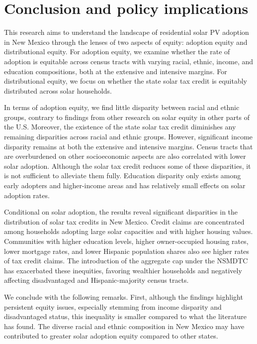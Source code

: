 \documentclass[11pt,twoside,letterpaper]{article}
\begin{document}
\section[Conclusion]{Conclusion and policy implications}

This research aims to understand the landscape of residential solar PV adoption in New Mexico through the lenses of two aspects of equity: adoption equity and distributional equity. For adoption equity, we examine whether the rate of adoption is equitable across census tracts with varying racial, ethnic, income, and education compositions, both at the extensive and intensive margins. For distributional equity, we focus on whether the state solar tax credit is equitably distributed across solar households.

In terms of adoption equity, we find little disparity between racial and ethnic groups, contrary to findings from other research on solar equity in other parts of the U.S. Moreover, the existence of the state solar tax credit diminishes any remaining disparities across racial and ethnic groups. However, significant income disparity remains at both the extensive and intensive margins. Census tracts that are overburdened on other socioeconomic aspects are also correlated with lower solar adoption. Although the solar tax credit reduces some of these disparities, it is not sufficient to alleviate them fully. Education disparity only exists among early adopters and higher-income areas and has relatively small effects on solar adoption rates.

Conditional on solar adoption, the results reveal significant disparities in the distribution of solar tax credits in New Mexico. Credit claims are concentrated among households adopting large solar capacities and with higher housing values. Communities with higher education levels, higher owner-occupied housing rates, lower mortgage rates, and lower Hispanic population shares also see higher rates of tax credit claims. The introduction of the aggregate cap under the NSMDTC has exacerbated these inequities, favoring wealthier households and negatively affecting disadvantaged and Hispanic-majority census tracts.

We conclude with the following remarks. First, although the findings highlight persistent equity issues, especially stemming from income disparity and disadvantaged status, this inequality is smaller compared to what the literature has found. The diverse racial and ethnic composition in New Mexico may have contributed to greater solar adoption equity compared to other states.
\end{document}
